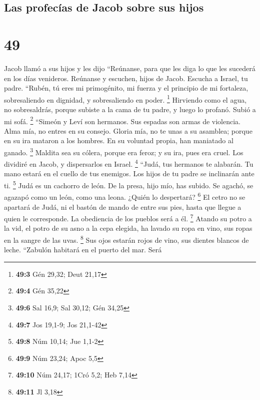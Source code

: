 \hypertarget{las-profecuxedas-de-jacob-sobre-sus-hijos}{%
\subsection{Las profecías de Jacob sobre sus
hijos}\label{las-profecuxedas-de-jacob-sobre-sus-hijos}}

\hypertarget{section-48}{%
\section{49}\label{section-48}}

 Jacob llamó a sus hijos y les dijo ``Reúnanse, para que
les diga lo que les sucederá en los días venideros. 
Reúnanse y escuchen, hijos de Jacob. Escucha a Israel, tu padre.
 ``Rubén, tú eres mi primogénito, mi fuerza y el principio
de mi fortaleza, sobresaliendo en dignidad, y sobresaliendo en poder.
\footnote{\textbf{49:3} Gén 29,32; Deut 21,17}  Hirviendo
como el agua, no sobresaldrás, porque subiste a la cama de tu padre, y
luego lo profanó. Subió a mi sofá. \footnote{\textbf{49:4} Gén 35,22}
 ``Simeón y Leví son hermanos. Sus espadas son armas de
violencia.  Alma mía, no entres en su consejo. Gloria mía,
no te unas a su asamblea; porque en su ira mataron a los hombres. En su
voluntad propia, han maniatado al ganado. \footnote{\textbf{49:6} Sal
  16,9; Sal 30,12; Gén 34,25}  Maldita sea su cólera,
porque era feroz; y su ira, pues era cruel. Los dividiré en Jacob, y
dispersarlos en Israel. \footnote{\textbf{49:7} Jos 19,1-9; Jos 21,1-42}
 ``Judá, tus hermanos te alabarán. Tu mano estará en el
cuello de tus enemigos. Los hijos de tu padre se inclinarán ante ti.
\footnote{\textbf{49:8} Núm 10,14; Jue 1,1-2}  Judá es un
cachorro de león. De la presa, hijo mío, has subido. Se agachó, se
agazapó como un león, como una leona. ¿Quién lo despertará? \footnote{\textbf{49:9}
  Núm 23,24; Apoc 5,5}  El cetro no se apartará de Judá,
ni el bastón de mando de entre sus pies, hasta que llegue a quien le
corresponde. La obediencia de los pueblos será a él. \footnote{\textbf{49:10}
  Núm 24,17; 1Cró 5,2; Heb 7,14}  Atando su potro a la
vid, el potro de su asno a la cepa elegida, ha lavado su ropa en vino,
sus ropas en la sangre de las uvas. \footnote{\textbf{49:11} Jl 3,18}
 Sus ojos estarán rojos de vino, sus dientes blancos de
leche.  ``Zabulón habitará en el puerto del mar. Será
